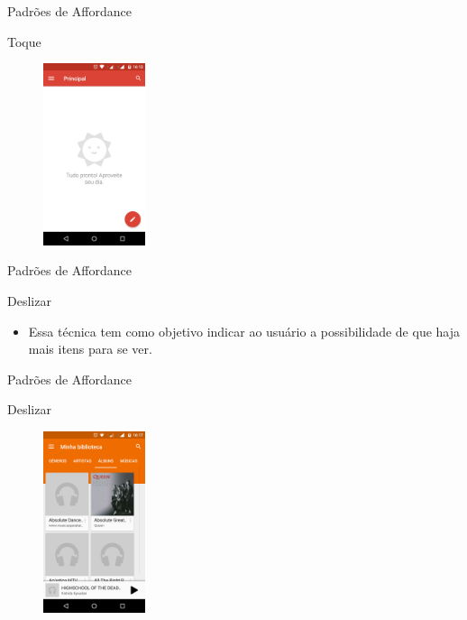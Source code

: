 \begin{frame}{Padrões de Affordance}
\begin{block}{Toque}
    \begin{figure}
    \includegraphics[width=3cm]{figuras/touch/tocar2}
    \end{figure}
\end{block}
\end{frame}

\begin{frame}{Padrões de Affordance}
\begin{block}{Deslizar}
  \begin{itemize}
    \item<1-> Essa técnica tem como objetivo indicar ao usuário a possibilidade de que haja mais itens para se ver.
  \end{itemize}
\end{block}
\end{frame}

\begin{frame}{Padrões de Affordance}
\begin{block}{Deslizar}
    \begin{figure}
    \includegraphics[width=3cm]{figuras/deslize/deslize2}
    \end{figure}
\end{block}
\end{frame}

